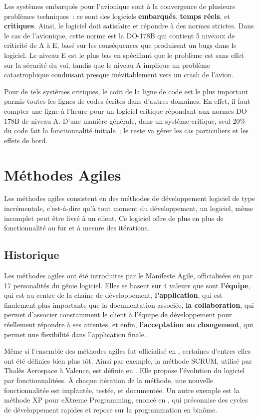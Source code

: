 \documentclass[a4paper,10pt]{article}
\begin{document}
Les systèmes embarqués pour l'avionique sont à la convergence de plusieurs
problèmes techniques~: ce sont des logiciels \textbf{embarqués}, 
\textbf{temps réels}, et \textbf{critiques}. Ainsi, le logiciel doit 
satisfaire et répondre à des normes strictes. Dans le cas de l'avionique,
cette norme est la DO-178B qui contient 5 niveaux de criticité de A à E,
basé sur les conséquences que produisent un bugs dans le logiciel. Le 
niveau E est le plus bas en spécifiant que le problème est sans effet sur
la sécurité du vol, tandis que le niveau A implique un problème 
catastrophique conduisant presque inévitablement vers un crash de l'avion.

Pour de tels systèmes critiques, le coût de la ligne de code est le plus
important parmis toutes les lignes de codes écrites dans d'autres domaines.
En effet, il faut compter une ligne à l'heure pour un logiciel critique 
répondant aux normes DO-178B de niveau A. D'une manière générale, dans un
système critique, seul 20\% du code fait la fonctionnalité initiale~; le 
reste va gérer les cas particuliers et les effets de bord.

\section{Méthodes Agiles}

Les méthodes agiles consistent en des méthodes de développement logiciel
de type incrémentale, c'est-à-dire qu'à tout moment du développement, un
logiciel, même incomplet peut être livré à un client. Ce logiciel offre de
plus en plus de fonctionnalité au fur et à mesure des itérations.

\subsection{Historique}

Les méthodes agiles ont été introduites par le Manifeste Agile, 
officialisées en  par 17 personalités du génie logiciel.
Elles se basent sur 4 valeurs que sont \textbf{l'équipe}, qui est au centre
de la chaîne de développement, \textbf{l'application}, qui est finalement 
plus importante que la documentation associée, \textbf{la collaboration}, 
qui permet d'associer constamment le client à l'équipe de développement 
pour réellement répondre à ses attentes, et enfin, \textbf{l'acceptation au
changement}, qui permet une flexibilité dans l'application finale.

Même si l'ensemble des méthodes agiles fut officialisé en 
, certaines d'entres elles ont été définies bien plus
tôt. Ainsi par exemple, la méthode SCRUM, utilisé par Thalès Aerospace à
Valence, est définie en . Elle propose l'évolution du 
logiciel par fonctionnalitées. À chaque itération de la méthode, une 
nouvelle fonctionnalitée est implantée, testée, et documentée. Un autre 
exemple est la méthode XP pour eXtreme Programming, enoncé en 
, qui préconnise des cycles de développement rapides et 
repose sur la programmation en binôme.
\end{document}
